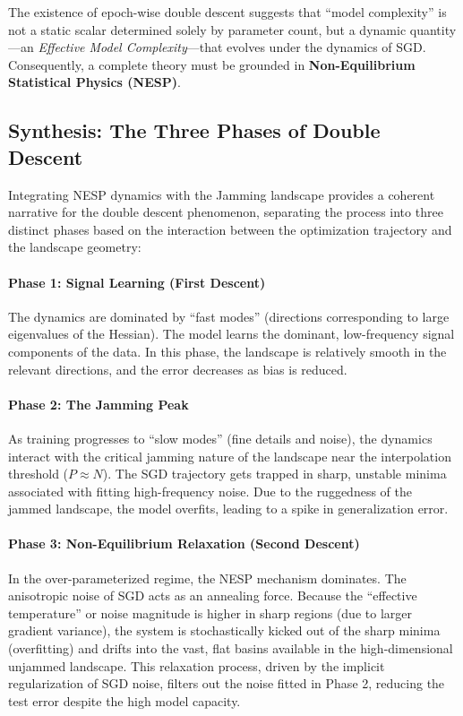\documentclass[
  journal=largetwo,
  simfonts=false,
  year=2025,
  volume=37,
]{cup-journal}
\begin{document}
The existence of epoch-wise double descent suggests that ``model complexity'' is not a static scalar determined solely by parameter count, but a dynamic quantity---an \textit{Effective Model Complexity}---that evolves under the dynamics of SGD. Consequently, a complete theory must be grounded in \textbf{Non-Equilibrium Statistical Physics (NESP)}.

\subsection{Synthesis: The Three Phases of Double Descent}
Integrating NESP dynamics with the Jamming landscape provides a coherent narrative for the double descent phenomenon, separating the process into three distinct phases based on the interaction between the optimization trajectory and the landscape geometry:

\paragraph{Phase 1: Signal Learning (First Descent)} 
The dynamics are dominated by ``fast modes'' (directions corresponding to large eigenvalues of the Hessian). The model learns the dominant, low-frequency signal components of the data. In this phase, the landscape is relatively smooth in the relevant directions, and the error decreases as bias is reduced.

\paragraph{Phase 2: The Jamming Peak} 
As training progresses to ``slow modes'' (fine details and noise), the dynamics interact with the critical jamming nature of the landscape near the interpolation threshold ($P \approx N$). The SGD trajectory gets trapped in sharp, unstable minima associated with fitting high-frequency noise. Due to the ruggedness of the jammed landscape, the model overfits, leading to a spike in generalization error.

\paragraph{Phase 3: Non-Equilibrium Relaxation (Second Descent)} 
In the over-parameterized regime, the NESP mechanism dominates. The anisotropic noise of SGD acts as an annealing force. Because the ``effective temperature'' or noise magnitude is higher in sharp regions (due to larger gradient variance), the system is stochastically kicked out of the sharp minima (overfitting) and drifts into the vast, flat basins available in the high-dimensional unjammed landscape. This relaxation process, driven by the implicit regularization of SGD noise, filters out the noise fitted in Phase 2, reducing the test error despite the high model capacity.
\end{document}
